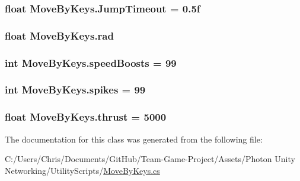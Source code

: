 \subsubsection[{\texorpdfstring{Jump\+Timeout}{JumpTimeout}}]{\setlength{\rightskip}{0pt plus 5cm}float Move\+By\+Keys.\+Jump\+Timeout = 0.\+5f}\hypertarget{class_move_by_keys_a78f351dfc4cfdf17213df54dee9ba73f}{}\label{class_move_by_keys_a78f351dfc4cfdf17213df54dee9ba73f}
\subsubsection[{\texorpdfstring{rad}{rad}}]{\setlength{\rightskip}{0pt plus 5cm}float Move\+By\+Keys.\+rad}\hypertarget{class_move_by_keys_ab257d4fc7ebb9aa457bb19c85dc7874d}{}\label{class_move_by_keys_ab257d4fc7ebb9aa457bb19c85dc7874d}
\subsubsection[{\texorpdfstring{speed\+Boosts}{speedBoosts}}]{\setlength{\rightskip}{0pt plus 5cm}int Move\+By\+Keys.\+speed\+Boosts = 99}\hypertarget{class_move_by_keys_abe7c462b0359cd7923ee81166dcbce50}{}\label{class_move_by_keys_abe7c462b0359cd7923ee81166dcbce50}
\subsubsection[{\texorpdfstring{spikes}{spikes}}]{\setlength{\rightskip}{0pt plus 5cm}int Move\+By\+Keys.\+spikes = 99}\hypertarget{class_move_by_keys_a69b4ceaaa671fa3a62ee1281b7c755b7}{}\label{class_move_by_keys_a69b4ceaaa671fa3a62ee1281b7c755b7}
\subsubsection[{\texorpdfstring{thrust}{thrust}}]{\setlength{\rightskip}{0pt plus 5cm}float Move\+By\+Keys.\+thrust = 5000}\hypertarget{class_move_by_keys_a5702f7b18a522ed877f1c1683e3acd6e}{}\label{class_move_by_keys_a5702f7b18a522ed877f1c1683e3acd6e}


The documentation for this class was generated from the following file\+:\begin{DoxyCompactItemize}
\item 
C\+:/\+Users/\+Chris/\+Documents/\+Git\+Hub/\+Team-\/\+Game-\/\+Project/\+Assets/\+Photon Unity Networking/\+Utility\+Scripts/\hyperlink{_move_by_keys_8cs}{Move\+By\+Keys.\+cs}\end{DoxyCompactItemize}
